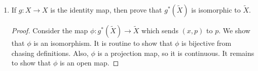 \documentclass{article}
\begin{document}
\begin{enumerate}
\begin{enumerate}
      \item If $g:X\rightarrow X$ is the identity map, then prove that
        $g^*(\tilde{X})$ is isomorphic to $\tilde{X}$.
        \begin{proof}
          Consider the map $\phi:g^*(\tilde{X})\rightarrow\tilde{X}$ which
          sends $(x,p)$ to $p$. We show that $\phi$ is an isomorphism.
          It is routine to show that $\phi$ is bijective from chasing
          definitions. Also, $\phi$ is a projection map, so it is
          continuous. It remains to show that $\phi$ is an open map.
        \end{proof}
    \end{enumerate}
\end{enumerate}
\end{document}

